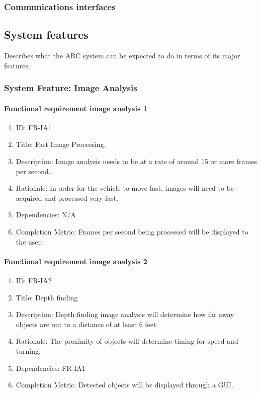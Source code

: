 \documentclass[compsoc,draftclsnofoot,onecolumn,10pt]{IEEEtran}
\begin{document}
	\subsubsection{Communications interfaces}


\subsection{System features}
Describes what the ARC system can be expected to do in terms of its major features.

\subsubsection{System Feature: Image Analysis}
	
	\paragraph{Functional requirement image analysis 1}
		\begin{enumerate}
			\item ID: FR-IA1
			\item Title: Fast Image Processing.
			\item Description: Image analysis needs to be at a rate of around 15 or more frames per second.
			\item Rationale: In order for the vehicle to move fast, images will need to be acquired and processed very fast.
			\item Dependencies: N/A
			\item Completion Metric: Frames per second being processed will be displayed to the user. 
		\end{enumerate}	

	\paragraph{Functional requirement image analysis 2}
		\begin{enumerate}
			\item ID: FR-IA2
			\item Title: Depth finding
			\item Description: Depth finding image analysis will determine how far away objects are out to a distance of at least 6 feet.
			\item Rationale: The proximity of objects will determine timing for speed and turning. 
			\item Dependencies: FR-IA1
			\item Completion Metric: Detected objects will be displayed through a GUI.
		\end{enumerate}
	
\end{document}
